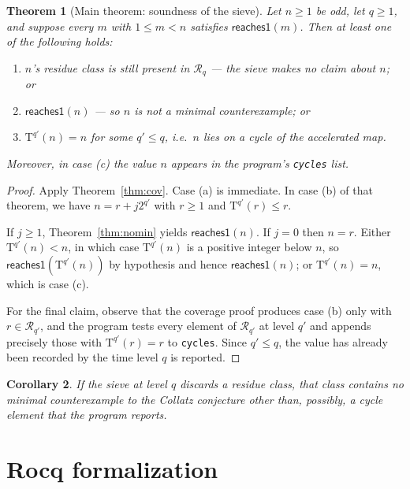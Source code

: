 \documentclass[11pt,a4paper]{article}
\theoremstyle{plain}
\newtheorem{theorem}{Theorem}[section]
\newtheorem{corollary}[theorem]{Corollary}
\theoremstyle{definition}
\newcommand{\Tmap}{\mathrm{T}}
\newcommand{\reaches}{\mathsf{reaches1}}
\newcommand{\Rlev}{\mathcal{R}}
\begin{document}
\begin{theorem}[Main theorem: soundness of the sieve]\label{thm:main}
Let $n \geq 1$ be odd, let $q \geq 1$, and suppose every $m$ with
$1 \leq m < n$ satisfies $\reaches(m)$. Then at least one of the following
holds:
\begin{enumerate}\itemsep1pt
\item[(a)] $n$'s residue class is still present in $\Rlev_{q}$ --- the sieve
      makes no claim about $n$; or
\item[(b)] $\reaches(n)$ --- so $n$ is not a minimal counterexample; or
\item[(c)] $\Tmap^{q'}(n) = n$ for some $q' \leq q$, i.e.\ $n$ lies on a
      cycle of the accelerated map.
\end{enumerate}
Moreover, in case (c) the value $n$ appears in the program's \texttt{cycles}
list.
\end{theorem}

\begin{proof}
Apply Theorem~\ref{thm:cov}. Case (a) is immediate. In case (b) of that
theorem, we have $n = r + j2^{q'}$ with $r \geq 1$ and
$\Tmap^{q'}(r) \leq r$.

If $j \geq 1$, Theorem~\ref{thm:nomin} yields $\reaches(n)$.
If $j = 0$ then $n = r$. Either $\Tmap^{q'}(n) < n$, in which case
$\Tmap^{q'}(n)$ is a positive integer below $n$, so $\reaches(\Tmap^{q'}(n))$
by hypothesis and hence $\reaches(n)$; or $\Tmap^{q'}(n) = n$, which is case
(c).

For the final claim, observe that the coverage proof produces case (b) only
with $r \in \Rlev_{q'}$, and the program tests every element of $\Rlev_{q'}$
at level $q'$ and appends precisely those with $\Tmap^{q'}(r) = r$ to
\texttt{cycles}. Since $q' \leq q$, the value has already been recorded by the
time level $q$ is reported.
\end{proof}

\begin{corollary}
If the sieve at level $q$ discards a residue class, that class contains no
minimal counterexample to the Collatz conjecture other than, possibly, a cycle
element that the program reports.
\end{corollary}

\section{Rocq formalization}
\label{sec:rocq}
\end{document}
